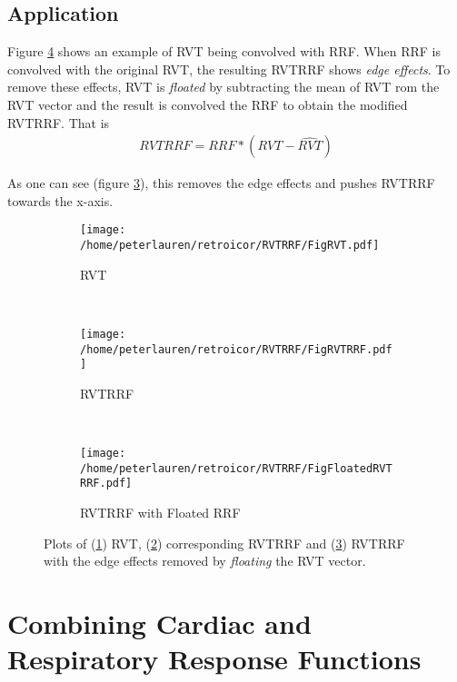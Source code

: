 \documentclass[twoside,twocolumn]{article}
\begin{document}
\subsection{Application}

Figure \ref{FigRVTRRF} shows an example of RVT being convolved with RRF.  When RRF is convolved with the original RVT, the resulting RVTRRF shows {\em edge effects}.  To remove these effects, RVT is {\em floated} by subtracting the mean of RVT rom the RVT vector and the result is convolved the RRF to obtain the modified RVTRRF.  That is
\begin{eqnarray}
	RVTRRF = RRF * (RVT-\hat{RVT})
\label{floatedRVTRRF}
\end{eqnarray}

As one can see (figure \ref{fig:sfig3}), this removes the edge effects and pushes RVTRRF towards the x-axis.

\begin{figure}
	\begin{subfigure}{.5\textwidth}
		\centering
		\texttt{[image: /home/peterlauren/retroicor/RVTRRF/FigRVT.pdf]}
		\caption{RVT}
		\label{fig:sfig1}
	\end{subfigure}%
	\\
	\begin{subfigure}{.5\textwidth}
		\centering
		\texttt{[image: /home/peterlauren/retroicor/RVTRRF/FigRVTRRF.pdf]}
		\caption{RVTRRF}
		\label{fig:sfig2}
	\end{subfigure}
	\\
	\begin{subfigure}{.5\textwidth}
		\centering
		\texttt{[image: /home/peterlauren/retroicor/RVTRRF/FigFloatedRVTRRF.pdf]}
		\caption{RVTRRF with Floated RRF}
		\label{fig:sfig3}
	\end{subfigure}
	\caption{Plots of (\ref{fig:sfig1}) RVT,  (\ref{fig:sfig2}) corresponding RVTRRF and (\ref{fig:sfig3}) RVTRRF with the edge effects removed by {\em floating} the RVT vector.}
	\label{FigRVTRRF}
\end{figure}

\section{Combining Cardiac and Respiratory Response Functions}
\end{document}

